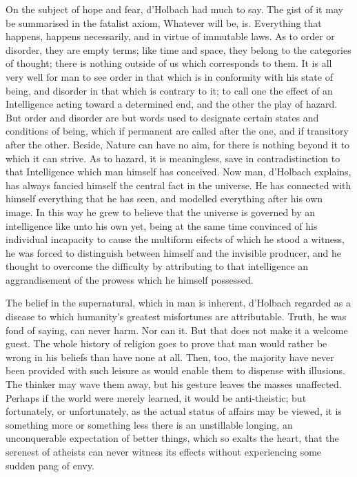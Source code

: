 \documentclass[]{book}
\begin{document}
On the subject of hope and fear, d'Holbach had much to say. The gist of
it may be summarised in the fatalist axiom, Whatever will be, is.
Everything that happens, happens necessarily, and in virtue of immutable
laws. As to order or disorder, they are empty terms; like time and
space, they belong to the categories of thought; there is nothing
outside of us which corresponds to them. It is all very well for man to
see order in that which is in conformity with his state of being, and
disorder in that which is contrary to it; to call one the effect of an
Intelligence acting toward a determined end, and the other the play of
hazard. But order and disorder are but words used to designate certain
states and conditions of being, which if permanent are called after the
one, and if transitory after the other. Beside, Nature can have no aim,
for there is nothing beyond it to which it can strive. As to hazard, it
is meaningless, save in contradistinction to that Intelligence which man
himself has conceived. Now man, d'Holbach explains, has always fancied
himself the central fact in the universe. He has connected with himself
everything that he has seen, and modelled everything after his own
image. In this way he grew to believe that the universe is governed by
an intelligence like unto his own yet, being at the same time convinced
of his individual incapacity to cause the multiform eifects of which he
stood a witness, he was forced to distinguish between himself and the
invisible producer, and he thought to overcome the difficulty by
attributing to that intelligence an aggrandisement of the prowess which
he himself possessed.

The belief in the supernatural, which in man is inherent, d'Holbach
regarded as a disease to which humanity's greatest misfortunes are
attributable. Truth, he was fond of saying, can never harm. Nor can it.
But that does not make it a welcome guest. The whole history of religion
goes to prove that man would rather be wrong in his beliefs than have
none at all. Then, too, the majority have never been provided with such
leisure as would enable them to dispense with illusions. The thinker may
wave them away, but his gesture leaves the masses unaffected. Perhaps if
the world were merely learned, it would be anti-theistic; but
fortunately, or unfortunately, as the actual status of affairs may be
viewed, it is something more or something less there is an unstillable
longing, an unconquerable expectation of better things, which so exalts
the heart, that the serenest of atheists can never witness its effects
without experiencing some sudden pang of envy.
\end{document}
